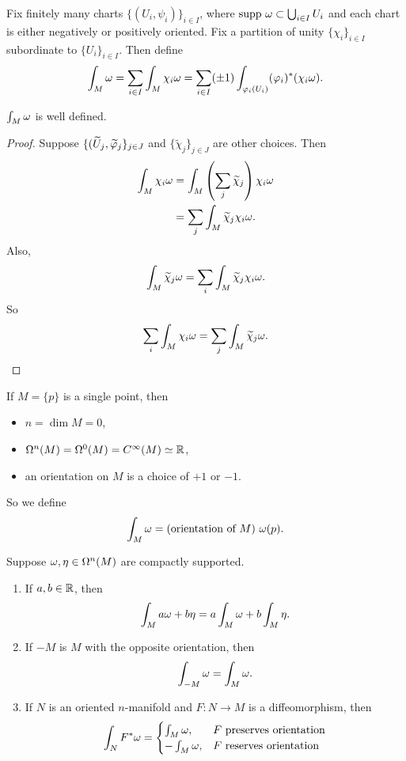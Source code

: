 \noindent{}
Fix finitely many charts $\{(U_i,\psi_i)\}_{i \in I}$, where $\mathrm{supp~} \omega \subset \bigcup_{i \in I}U_i$ and each chart is either negatively or positively oriented. Fix a partition of unity $\{\chi_i\}_{i \in I}$ subordinate to $\{U_i\}_{i \in I}$. Then define 
$$\int_M \omega = \sum_{i \in I}\int_M \chi_i \omega = \sum_{i \in I} (\pm 1)\int_{\varphi_i(U_i)}(\varphi_i)^*(\chi_i \omega). $$
\begin{proposition}
    $\int_M\omega$ is well defined. 
\end{proposition}
\begin{proof}
    Suppose $\{(\widetilde{U}_j, \widetilde{\varphi}_j\}_{j \in J}$ and $\{\widetilde{\chi}_j\}_{j \in J}$ are other choices. Then 
    \begin{align*}
    \int_M \chi_i \omega &= \int_M \left(\sum_j \widetilde{\chi}_j\right)\chi_i \omega \\
    &= \sum_j \int_M \widetilde{\chi}_j \chi_i \omega. 
    \end{align*}
    Also, 
    $$\int_M \widetilde{\chi}_j \omega = \sum_i \int_M \widetilde{\chi}_j \chi_i \omega. $$
    So $$\sum_i \int_M \chi_i \omega = \sum_j \int_M \widetilde{\chi}_j \omega. $$
\end{proof}
\noindent{} If $M = \{p\}$ is a single point, then 
\begin{itemize}
    \item $n=\dim M = 0$,
    \item $\Omega^n(M) = \Omega^0(M) = C^\infty(M) \simeq \mathbb{R}$, 
    \item an orientation on $M$ is a choice of $+1$ or $-1$. 
\end{itemize}
So we define 
$$\int_M \omega = (\text{orientation of }M)~\omega(p). $$
\begin{proposition}[Properties]\label{16.6}
    Suppose $\omega, \eta \in \Omega^n(M)$ are compactly supported. 
    \begin{enumerate}
    \item If $a,b \in \mathbb{R}$, then 
    $$\int_M a\omega + b\eta = a\int_M \omega + b\int_M \eta. $$
    \item If $-M$ is $M$ with the opposite orientation, then 
    $$\int_{-M}\omega = \int_M \omega. $$
    \item If $N$ is an oriented $n$-manifold and $F:N \to M$ is a diffeomorphism, then 
    $$\int_N F^*\omega = \begin{cases}
        \int_M \omega, & F \text{ preserves orientation} \\
        -\int_M \omega, & F \text{ reserves orientation} 
    \end{cases}$$
    \end{enumerate}
\end{proposition}
